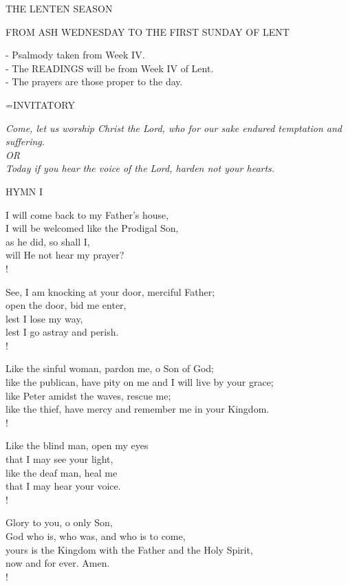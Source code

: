\begin{center}\normalsize THE LENTEN SEASON\\
\begin{center}
\normalsize \footnotesize FROM ASH WEDNESDAY TO THE FIRST SUNDAY OF LENT\\
\end{center}
\footnotesize - Psalmody taken from Week IV.\\
\footnotesize - The READINGS will be from Week IV of Lent.\\
\footnotesize - The prayers are those proper to the day.\\
\end{center}

\hangindent=\parindent \small{INVITATORY}
\begin{center}
\textit{Come, let us worship Christ the Lord, who for our sake endured temptation and suffering.\\}
\textit{OR\\}
\textit{Today if you hear the voice of the Lord, harden not your hearts.\\}
\end{center}

\noindent\small{\uppercase{Hymn I }}\normalsize\label{lent:firstHymn}
\begin{cverse}
I will come back to my Father's house,\\
I will be welcomed like the Prodigal Son,\\
as he did, so shall I,\\
will He not hear my prayer?\\!

See, I am knocking at your door, merciful Father;\\
open the door, bid me enter,\\
lest I lose my way,\\
lest I go astray and perish.\\!

Like the sinful woman, pardon me, o Son of God;\\
like the publican, have pity on me and I will live by your grace;\\
like Peter amidst the waves, rescue me;\\
like the thief, have mercy and remember me in your Kingdom.\\!

Like the blind man, open my eyes\\
that I may see your light,\\
like the deaf man,  heal me\\
that I may hear your voice.\\!

Glory to you, o only Son,\\
God who is, who was, and who is to come,\\
yours is the Kingdom with the Father and the Holy Spirit,\\
now and for ever. Amen.\\!
\end{cverse}

